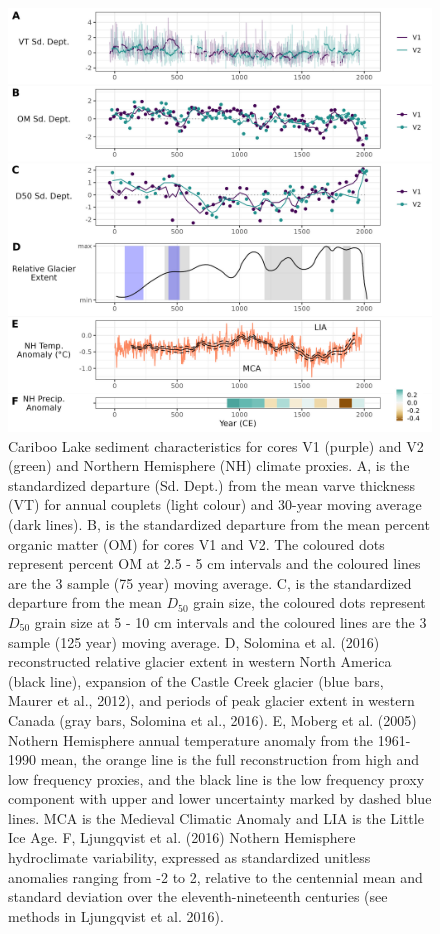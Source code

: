 \documentclass[Royal,times,doublespace,sageh]{sagej}
\begin{document}
\begin{figure}

{\centering \includegraphics[width=1\linewidth]{figs/all_core_stats_2k_anomalies} 

}

\caption{Cariboo Lake sediment characteristics for cores V1 (purple) and V2 (green) and Northern Hemisphere (NH) climate proxies. A, is the standardized departure (Sd. Dept.) from the mean varve thickness (VT) for annual couplets (light colour) and 30-year moving average (dark lines). B, is the standardized departure from the mean percent organic matter (OM) for cores V1 and V2. The coloured dots represent percent OM at 2.5 - 5 cm intervals and the coloured lines are the 3 sample (75 year) moving average. C, is the standardized departure from the mean $D_{50}$ grain size, the coloured dots represent $D_{50}$ grain size at 5 - 10 cm intervals and the coloured lines are the 3 sample (125 year) moving average. D, Solomina et al. (2016) reconstructed relative glacier extent in western North America (black line), expansion of the Castle Creek glacier (blue bars, Maurer et al., 2012), and periods of peak glacier extent in western Canada (gray bars, Solomina et al., 2016). E, Moberg et al. (2005) Nothern Hemisphere annual temperature anomaly from the 1961-1990 mean, the orange line is the full reconstruction from high and low frequency proxies, and the black line is the low frequency proxy component with upper and lower uncertainty marked by dashed blue lines. MCA is the Medieval Climatic Anomaly and LIA is the Little Ice Age. F, Ljungqvist et al. (2016) Nothern Hemisphere hydroclimate variability, expressed as standardized unitless anomalies ranging from -2 to 2, relative to the centennial mean and standard deviation over the eleventh-nineteenth centuries (see methods in Ljungqvist et al. 2016).}\label{fig:proxy-comparison}
\end{figure}
\end{document}
